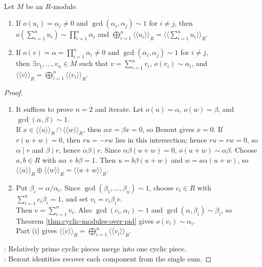 \begin{theorem} \label{thm:cyclic-composition-coprime-orders} \\
Let $M$ be an $R$-module.
\begin{enumerate}[label=(\roman*)]
\setlength{\itemsep}{0pt}
\item If $o(u_i)=\alpha_i\neq0$ and $\gcd(\alpha_i,\alpha_j)\sim1$ for $i\neq j$, then $o(\sum\limits_{i=1}^{n}u_i)\sim\prod_{i=1}^{n}\alpha_i$ and $\bigoplus\limits_{i=1}^{n}\langle\!\langle u_i\rangle\!\rangle_R =\langle\!\langle\sum\limits_{i=1}^{n}u_i\rangle\!\rangle_R$.
\item If $o(v)=\alpha=\prod\limits_{i=1}^{n}\alpha_i\neq0$ and $\gcd(\alpha_i,\alpha_j)\sim1$ for $i\neq j$,\\
then $\exists v_1,\ldots,v_n\in M$ such that $v=\sum\limits_{i=1}^{n}v_i$, $o(v_i)\sim\alpha_i$, and $\langle\!\langle v\rangle\!\rangle_R =\bigoplus\limits_{i=1}^{n}\langle\!\langle v_i\rangle\!\rangle_R$.
\end{enumerate}
\begin{proof}
\begin{enumerate}[label=(\roman*)]
\setlength{\itemsep}{0pt}
\item It suffices to prove $n=2$ and iterate. Let $o(u)=\alpha$, $o(w)=\beta$, and $\gcd(\alpha,\beta)\sim1$.\\
If $x\in\langle\!\langle u\rangle\!\rangle_R\cap\langle\!\langle w\rangle\!\rangle_R$, then $\alpha x=\beta x=0$, so Bezout gives $x=0$.  If $r(u+w)=0$, then $ru=-rw$ lies in this intersection; hence $ru=rw=0$, so $\alpha\mid r$ and $\beta\mid r$, hence $\alpha\beta\mid r$. Since $\alpha\beta(u+w)=0$, $o(u+w)\sim\alpha\beta$. Choose $a,b\in R$ with $a\alpha+b\beta=1$. Then $u=b\beta(u+w)$ and $w=a\alpha(u+w)$, so $\langle\!\langle u\rangle\!\rangle_R\oplus \langle\!\langle w\rangle\!\rangle_R=\langle\!\langle u+w\rangle\!\rangle_R$.
\item Put $\beta_i=\alpha/\alpha_i$. Since $\gcd(\beta_1,\ldots,\beta_n)\sim1$, choose $c_i\in R$ with $\sum\limits_{i=1}^{n}c_i\beta_i=1$, and set $v_i=c_i\beta_i v$.\\
Then $v=\sum\limits_{i=1}^{n}v_i$. Also $\gcd(c_i,\alpha_i)\sim1$ and $\gcd(\alpha,\beta_i)\sim\beta_i$, so Theorem \ref{thm:cyclic-modules-over-pid} gives $o(v_i)\sim\alpha_i$.\\
Part (i) gives $\langle\!\langle v\rangle\!\rangle_R =\bigoplus\limits_{i=1}^{n}\langle\!\langle v_i\rangle\!\rangle_R$.
\end{enumerate}
\noindent
{}: Relatively prime cyclic pieces merge into one cyclic piece.\\
: Bezout identities recover each component from the single sum.
\end{proof}
\end{theorem}

